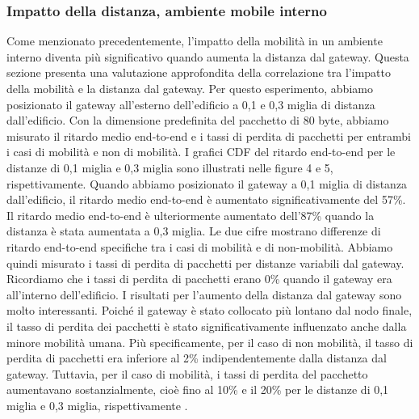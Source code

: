 \documentclass[a4paper]{report} %
\begin{document}
\subsubsection{Impatto della distanza, ambiente mobile interno}
Come menzionato precedentemente, l'impatto della mobilità in un ambiente interno diventa più significativo quando aumenta la distanza dal gateway. Questa sezione presenta una valutazione approfondita della correlazione tra l'impatto della mobilità e la distanza dal gateway. Per questo esperimento, abbiamo posizionato il gateway all'esterno dell'edificio a 0,1 e 0,3 miglia di distanza dall'edificio. Con la dimensione predefinita del pacchetto di 80 byte, abbiamo misurato il ritardo medio end-to-end e i tassi di perdita di pacchetti per entrambi i casi di mobilità e non di mobilità. I grafici CDF del ritardo end-to-end per le distanze di 0,1 miglia e 0,3 miglia sono illustrati nelle figure 4 e 5, rispettivamente. Quando abbiamo posizionato il gateway a 0,1 miglia di distanza dall'edificio, il ritardo medio end-to-end è aumentato significativamente del 57\%. Il ritardo medio end-to-end è ulteriormente aumentato dell'87\% quando la distanza è stata aumentata a 0,3 miglia. Le due cifre mostrano differenze di ritardo end-to-end specifiche tra i casi di mobilità e di non-mobilità. Abbiamo quindi misurato i tassi di perdita di pacchetti per distanze variabili dal gateway. Ricordiamo che i tassi di perdita di pacchetti erano 0\% quando il gateway era all'interno dell'edificio. I risultati per l'aumento della distanza dal gateway sono molto interessanti. Poiché il gateway è stato collocato più lontano dal nodo finale, il tasso di perdita dei pacchetti è stato significativamente influenzato anche dalla minore mobilità umana. Più specificamente, per il caso di non mobilità, il tasso di perdita di pacchetti era inferiore al 2\% indipendentemente dalla distanza dal gateway. Tuttavia, per il caso di mobilità, i tassi di perdita del pacchetto aumentavano sostanzialmente, cioè fino al 10\% e il 20\% per le distanze di 0,1 miglia e 0,3 miglia, rispettivamente \cite{art:rif.47}.
\end{document}
